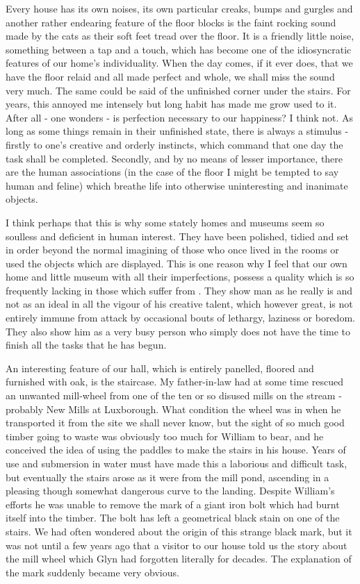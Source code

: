Every house has its own noises, its own particular creaks, bumps and gurgles and another rather endearing feature of the floor blocks is the faint rocking sound made by the cats as their soft feet tread over the floor. It is a friendly little noise, something between a tap and a touch, which has become one of the idiosyncratic features of our home's individuality. When the day comes, if it ever does, that we have the floor relaid and all made perfect and whole, we shall miss the sound very much. The same could be said of the unfinished corner under the stairs. For years, this annoyed me intensely but long habit has made me grow used to it. After all - one wonders - is perfection necessary to our happiness? I think not. As long as some things remain in their unfinished state, there is always a stimulus - firstly to one's creative and orderly instincts, which command that one day the task shall be completed. Secondly, and by no means of lesser importance, there are the human associations (in the case of the floor I might be tempted to say human and feline) which breathe life into otherwise uninteresting and inanimate objects.

I think perhaps that this is why some stately homes and museums seem so soulless and deficient in human interest. They have been polished, tidied and set in order beyond the normal imagining of those who once lived in the rooms or used the objects which are displayed. This is one reason why I feel that our own home and little museum with all their imperfections, possess a quality which is so frequently lacking in those which suffer from . They show man as he really is and not as an ideal in all the vigour of his creative talent, which however great, is not entirely immune from attack by occasional bouts of lethargy, laziness or boredom. They also show him as a very busy person who simply does not have the time to finish all the tasks that he has begun.

An interesting feature of our hall, which is entirely panelled, floored and furnished with oak, is the staircase. My father-in-law had at some time rescued an unwanted mill-wheel from one of the ten or so disused mills on the stream - probably New Mills at Luxborough. What condition the wheel was in when he transported it from the site we shall never know, but the sight of so much good timber going to waste was obviously too much for William to bear, and he conceived the idea of using the paddles to make the stairs in his house. Years of use and submersion in water must have made this a laborious and difficult task, but eventually the stairs arose as it were from the mill pond, ascending in a pleasing though somewhat dangerous curve to the landing. Despite William's efforts he was unable to remove the mark of a giant iron bolt which had burnt itself into the timber. The bolt has left a geometrical black stain on one of the stairs. We had often wondered about the origin of this strange black mark, but it was not until a few years ago that a visitor to our house told us the story about the mill wheel which Glyn had forgotten literally for decades. The explanation of the mark suddenly became very obvious.

